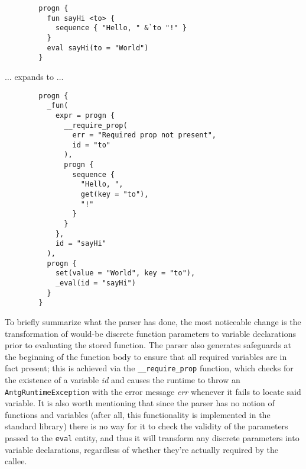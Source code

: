 \begin{multicols*}{2}
	\begin{verbatim}
		progn {
		  fun sayHi <to> {
		    sequence { "Hello, " &`to "!" }
		  }
		  eval sayHi(to = "World")
		}
	\end{verbatim}
	$\dots$ expands to $\dots$
	\begin{verbatim}
		progn {
		  _fun(
		    expr = progn {
		      __require_prop(
		        err = "Required prop not present",
		        id = "to"
		      ),
		      progn {
		        sequence {
		          "Hello, ",
		          get(key = "to"),
		          "!"
		        }
		      }
		    },
		    id = "sayHi"
		  ),
		  progn {
		    set(value = "World", key = "to"),
		    _eval(id = "sayHi")
		  }
		}
	\end{verbatim}
	To briefly summarize what the parser has done, the most noticeable change is the transformation of would-be
	discrete function parameters to variable declarations prior to evaluating the stored function.
	The parser also generates safeguards at the beginning of the function body to ensure that all required
	variables are in fact present; this is achieved via the \verb|__require_prop| function, which checks
	for the existence of a variable \textit{id} and causes the runtime to throw an \verb|AntgRuntimeException|
	with the error message \textit{err} whenever it fails to locate said variable.
	It is also worth mentioning that since the parser has no notion of functions and variables (after all, this functionality
	is implemented in the standard library) there is no way for it to check the validity of the parameters passed to the
	\verb|eval| entity, and thus it will transform any discrete parameters into variable declarations, regardless of whether
	they're actually required by the callee.
\end{multicols*}
\newpage